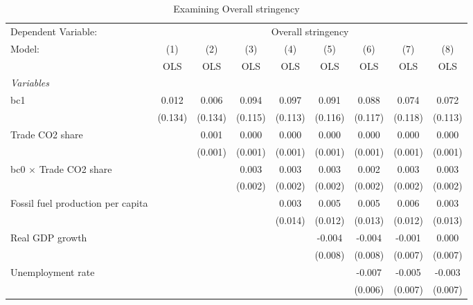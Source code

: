 
\begin{table}[htbp]
   \caption{Examining Overall stringency}
   \centering
   \begin{tabular}{lcccccccc}
      \toprule
      Dependent Variable: & \multicolumn{8}{c}{Overall stringency}\\
      Model:                                  & (1)     & (2)     & (3)     & (4)     & (5)     & (6)     & (7)     & (8)\\  
                                              &  OLS    & OLS     & OLS     & OLS     & OLS     & OLS     & OLS     & OLS\\  
      \midrule
      \emph{Variables}\\
      bc1                                     & 0.012   & 0.006   & 0.094   & 0.097   & 0.091   & 0.088   & 0.074   & 0.072\\   
                                              & (0.134) & (0.134) & (0.115) & (0.113) & (0.116) & (0.117) & (0.118) & (0.113)\\   
      Trade CO2 share                         &         & 0.001   & 0.000   & 0.000   & 0.000   & 0.000   & 0.000   & 0.000\\   
                                              &         & (0.001) & (0.001) & (0.001) & (0.001) & (0.001) & (0.001) & (0.001)\\   
      bc0 $\times$ Trade CO2 share            &         &         & 0.003   & 0.003   & 0.003   & 0.002   & 0.003   & 0.003\\   
                                              &         &         & (0.002) & (0.002) & (0.002) & (0.002) & (0.002) & (0.002)\\   
      Fossil fuel production per capita       &         &         &         & 0.003   & 0.005   & 0.005   & 0.006   & 0.003\\   
                                              &         &         &         & (0.014) & (0.012) & (0.013) & (0.012) & (0.013)\\   
      Real GDP growth                         &         &         &         &         & -0.004  & -0.004  & -0.001  & 0.000\\   
                                              &         &         &         &         & (0.008) & (0.008) & (0.007) & (0.007)\\   
      Unemployment rate                       &         &         &         &         &         & -0.007  & -0.005  & -0.003\\   
                                              &         &         &         &         &         & (0.006) & (0.007) & (0.007)\\   

\end{tabular}
\end{table}
